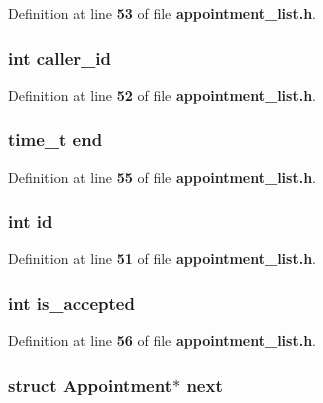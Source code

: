 Definition at line {\bf 53} of file {\bf appointment\+\_\+list.\+h}.

\subsubsection[{caller\+\_\+id}]{\setlength{\rightskip}{0pt plus 5cm}int caller\+\_\+id}\label{struct_appointment_a677c4126148ba11b303127cd76cf9e35}


Definition at line {\bf 52} of file {\bf appointment\+\_\+list.\+h}.

\subsubsection[{end}]{\setlength{\rightskip}{0pt plus 5cm}time\+\_\+t end}\label{struct_appointment_a13455ba845bf5d4dba37be491bc6a036}


Definition at line {\bf 55} of file {\bf appointment\+\_\+list.\+h}.

\subsubsection[{id}]{\setlength{\rightskip}{0pt plus 5cm}int id}\label{struct_appointment_a7441ef0865bcb3db9b8064dd7375c1ea}


Definition at line {\bf 51} of file {\bf appointment\+\_\+list.\+h}.

\subsubsection[{is\+\_\+accepted}]{\setlength{\rightskip}{0pt plus 5cm}int is\+\_\+accepted}\label{struct_appointment_a30449d2de0bda7cca32135a283b0162b}


Definition at line {\bf 56} of file {\bf appointment\+\_\+list.\+h}.

\subsubsection[{next}]{\setlength{\rightskip}{0pt plus 5cm}struct {\bf Appointment}$\ast$ next}\label{struct_appointment_a7a0b65c736183dbc90fdeb836add2a10}


